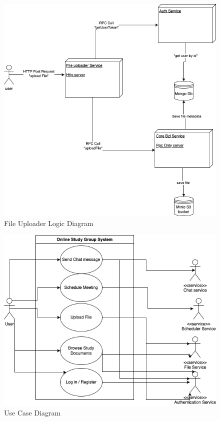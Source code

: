 \begin{figure}[!ht]
    \centering
    \includegraphics[width=1\linewidth]{Ples Serban Thesis/file uplaod.drawio.png}
    \caption{File Uploader Logic Diagram}
    \label{fig:uploaderLogic}
\end{figure}

\begin{figure}[!ht]
    \centering
    \includegraphics[width=1\linewidth]{Ples Serban Thesis/Use Case Licenta.drawio.png}
    \caption{Use Case Diagram}
    \label{fig:useCase}
\end{figure}


